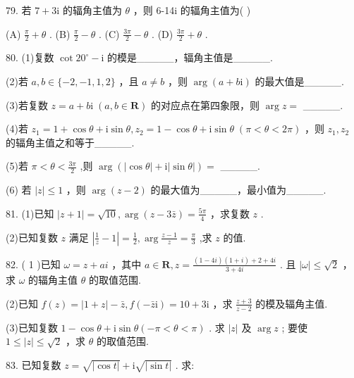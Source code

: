 \documentclass[10pt]{article}
\newcommand*\circled[1]{\tikz[baseline=(char.base)]{\node[shape=circle,draw,inner sep=1.5pt] (char) {\small #1};}}
\begin{document}
79. 若 \(7 + 3\mathrm{i}\) 的辐角主值为 \(\theta\) ，则 6-14i 的辐角主值为( )

(A) \(\frac{\pi }{2} + \theta\) . (B) \(\frac{\pi }{2} - \theta\) . (C) \(\frac{3\pi }{2} - \theta\) . (D) \(\frac{3\pi }{2} + \theta\) .

80. (1)复数 \(\cot {20}^{ \circ  } - \mathrm{i}\) 的模是\_\_\_\_\_，辐角主值是\_\_\_\_\_.

(2)若 \(a,b \in  \{  - 2, - 1,1,2\}\) ，且 \(a \neq  b\) ，则 \(\arg \left( {a + b\mathrm{i}}\right)\) 的最大值是\_\_\_\_\_.

(3)若复数 \(z = a + b\mathrm{i}\;\left( {a,b \in  \mathbf{R}}\right)\) 的对应点在第四象限，则 \(\arg z =\) \_\_\_\_\_.

(4)若 \({z}_{1} = 1 + \cos \theta  + \mathrm{i}\sin \theta ,{z}_{2} = 1 - \cos \theta  + \mathrm{i}\sin \theta \;\left( {\pi  < \theta  < {2\pi }}\right)\) ，则 \({z}_{1},{z}_{2}\) 的辐角主值之和等于\_\_\_\_\_.

(5)若 \(\pi  < \theta  < \frac{3\pi }{2}\) ,则 \(\arg \left( {\left| {\cos \theta }\right|  + \mathrm{i}\left| {\sin \theta }\right| }\right)  =\) \_\_\_\_\_.

(6) 若 \(\left| z\right|  \leq  1\) ，则 \(\arg \left( {z - 2}\right)\) 的最大值为\_\_\_\_\_，最小值为\_\_\_\_\_.

81. (1)已知 \(\left| {z + 1}\right|  = \sqrt{10},\arg \left( {z - 3\bar{z}}\right)  = \frac{5\pi }{4}\) ，求复数 \(z\) .

(2)已知复数 \(z\) 满足 \(\left| {\frac{1}{z} - 1}\right|  = \frac{1}{2},\arg \frac{z - 1}{z} = \frac{\pi }{3}\) ,求 \(z\) 的值.

82. ( 1 )已知 \(\omega  = z + {ai}\) ，其中 \(a \in  \mathbf{R},z = \frac{\left( {1 - {4i}}\right) \left( {1 + i}\right)  + 2 + {4i}}{3 + {4i}}\) . 且 \(\left| \omega \right|  \leq  \sqrt{2}\) ，求 \(\omega\) 的辐角主值 \(\theta\) 的取值范围.

(2)已知 \(f\left( z\right)  = \left| {1 + z}\right|  - \bar{z},f\left( {-\bar{z}\mathrm{i}}\right)  = {10} + 3\mathrm{i}\) ，求 \(\frac{z + 3}{z - 2}\) 的模及辐角主值.

(3)已知复数 \(1 - \cos \theta  + \mathrm{i}\sin \theta \left( {-\pi  < \theta  < \pi }\right)\) .  \circled{1}  求 \(\left| z\right|\) 及 \(\arg z\) ;  \circled{2} 要使 \(1 \leq  \left| z\right|  \leq  \sqrt{2}\) ，求 \(\theta\) 的取值范围.

83. 已知复数 \(z = \sqrt{\left| \cos t\right| } + \mathrm{i}\sqrt{\left| \sin t\right| }\) . 求:
\end{document}
